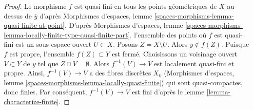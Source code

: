 \begin{proof}
Le morphisme $f$ est quasi-fini en tous les points géométriques de $X$
au-dessus de $\overline{y}$ d'après
Morphismes d'espaces, lemme \ref{spaces-morphisms-lemma-quasi-finite-at-point}.
D'après Morphismes d'espaces, lemme
\ref{spaces-morphisms-lemma-locally-finite-type-quasi-finite-part}, l'ensemble
des points où $f$ est quasi-fini est un sous-espace ouvert $U \subset X$.
Posons $Z = X \setminus U$. Alors $\overline{y} \not \in f(Z)$. Puisque $f$
est propre, l'ensemble $f(Z) \subset Y$ est fermé. Choisissons un voisinage ouvert
$V \subset Y$ de $\overline{y}$ tel que $Z \cap V = \emptyset$. Alors
$f^{-1}(V) \to V$ est localement quasi-fini et propre.
Ainsi, $f^{-1}(V) \to V$ a des fibres discrètes $X_k$
(Morphismes d'espaces, lemme
\ref{spaces-morphisms-lemma-locally-quasi-finite})
qui sont quasi-compactes, donc finies.
Par conséquent, $f^{-1}(V) \to V$
est fini d'après le lemme \ref{lemma-characterize-finite}.
\end{proof}










